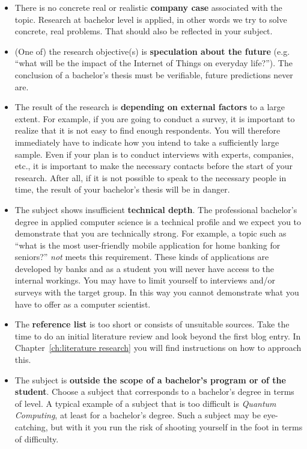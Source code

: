 \begin{itemize}
  \item There is no concrete real or realistic \textbf{company case} associated with the topic. Research at bachelor level is applied, in other words we try to solve concrete, real problems. That should also be reflected in your subject.
  \item (One of) the research objective(s) is \textbf{speculation about the future} (e.g.  ``what will be the impact of the Internet of Things on everyday life?''). The conclusion of a bachelor's thesis must be verifiable, future predictions never are.
  \item The result of the research is \textbf{depending on external factors} to a large extent. For example, if you are going to conduct a survey, it is important to realize that it is not easy to find enough respondents. You will therefore immediately have to indicate how you intend to take a sufficiently large sample. Even if your plan is to conduct interviews with experts, companies, etc., it is important to make the necessary contacts before the start of your research. After all, if it is not possible to speak to the necessary people in time, the result of your bachelor's thesis will be in danger.
  \item The subject shows insufficient \textbf{technical depth}. The professional bachelor's degree in applied computer science is a technical profile and we expect you to demonstrate that you are technically strong. For example, a topic such as ``what is the most user-friendly mobile application for home banking for seniors?'' \textit{not} meets this requirement. These kinds of applications are developed by banks and as a student you will never have access to the internal workings. You may have to limit yourself to interviews and/or surveys with the target group. In this way you cannot demonstrate what you have to offer as a computer scientist.
  \item The \textbf{reference list} is too short or consists of unsuitable sources. Take the time to do an initial literature review and look beyond the first blog entry. In Chapter~\ref{ch:literature research} you will find instructions on how to approach this.
  \item The subject is \textbf{outside the scope of a bachelor's program or of the student}. Choose a subject that corresponds to a bachelor's degree in terms of level. A typical example of a subject that is too difficult is \textit{Quantum Computing}, at least for a bachelor's degree. Such a subject may be eye-catching, but with it you run the risk of shooting yourself in the foot in terms of difficulty.     
\end{itemize}

